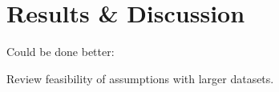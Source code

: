 \clearpage
\section{Results \& Discussion}
\label{sec:Results}

Could be done better:

Review feasibility of assumptions with larger datasets.